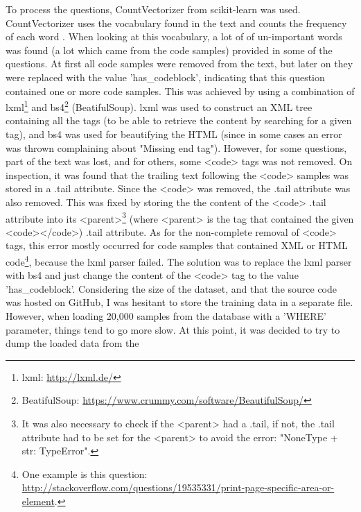 \noindent
To process the questions, CountVectorizer from scikit-learn was used. CountVectorizer uses the vocabulary found 
in the text and counts the frequency of each word \cite{Scikitlearn.org2016b} \cite[4.2.3]{Scikitlearn.org2016}. 
When looking at this vocabulary, a lot of of un-important words was found (a lot which came from the code 
samples) provided in some of the questions. At first all code samples were removed from the text, but later on 
they were replaced with the value 'has\_codeblock', indicating that this question contained one or more code 
 samples. This was achieved by using a combination of lxml\footnote{lxml: \url{http://lxml.de/}} and 
bs4\footnote{BeatifulSoup: \url{https://www.crummy.com/software/BeautifulSoup/}} (BeatifulSoup). lxml was used 
to construct an XML tree containing all the tags (to be able to retrieve the content by searching for a given 
tag), and bs4 was used for beautifying the HTML (since in some cases an error was thrown complaining about 
"Missing end tag").
\vspace{0.5em}\newline
However, for some questions, part of the text was lost, and for others, some <code> tags was not removed. 
On inspection, it was found that the trailing text following the <code> samples was stored in a .tail attribute. 
Since the <code> was removed, the .tail attribute was also removed. This was fixed by storing the the content 
of the <code> .tail attribute into its <parent>\footnote{It was also necessary to check if the 
	<parent> had a .tail, if not, the .tail attribute had to be set for the <parent> to avoid the error: 
	"NoneType + str: TypeError".} (where <parent> is the tag that contained the given <code></code>) .tail 
attribute. As for the non-complete removal of <code> tags, this error mostly occurred for code samples that 
contained XML or HTML code\footnote{One example is this question: \\
	\url{http://stackoverflow.com/questions/19535331/print-page-specific-area-or-element}.}, because the lxml 
parser failed. The solution was to replace the lxml parser with bs4 and just change the content of the <code> 
tag to the value 'has\_codeblock'.
\vspace{0.5em}\newline
Considering the size of the dataset, and that the source code was hosted on GitHub, I was hesitant to store 
the training data in a separate file. However, when loading 20,000 samples from the database with a 'WHERE' 
parameter, things tend to go more slow. At this point, it was decided to try to dump the loaded data from the 
